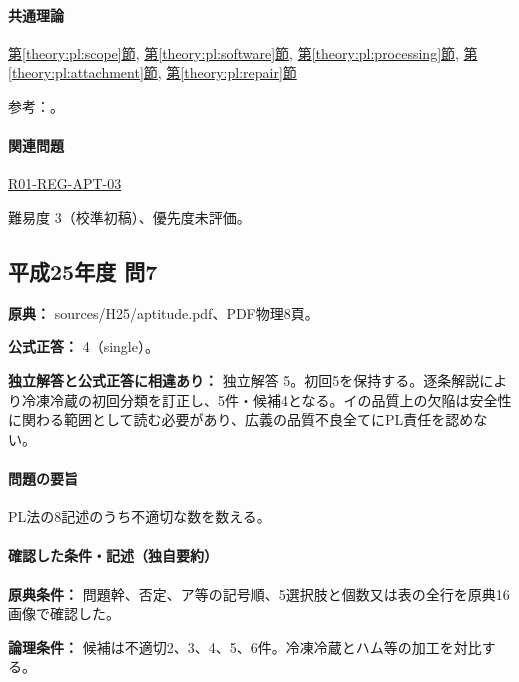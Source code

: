 \paragraph{共通理論} \hyperref[theory:pl:scope]{第\ref*{theory:pl:scope}節}, \hyperref[theory:pl:software]{第\ref*{theory:pl:software}節}, \hyperref[theory:pl:processing]{第\ref*{theory:pl:processing}節}, \hyperref[theory:pl:attachment]{第\ref*{theory:pl:attachment}節}, \hyperref[theory:pl:repair]{第\ref*{theory:pl:repair}節}

\par 参考：\cite{pl_statute,pl_qa,pl_definitions2018}。

\paragraph{関連問題} \hyperref[q:r01-reg-apt-03]{R01-REG-APT-03}

\par 難易度 3（校準初稿）、優先度未評価。

\subsection{平成25年度 問7}
\label{q:h25-reg-apt-07}

\noindent\textbf{原典：} sources/H25/aptitude.pdf、PDF物理8頁。

\textbf{公式正答：} 4（single）。

\par\textbf{独立解答と公式正答に相違あり：} 独立解答 5。初回5を保持する。逐条解説により冷凍冷蔵の初回分類を訂正し、5件・候補4となる。イの品質上の欠陥は安全性に関わる範囲として読む必要があり、広義の品質不良全てにPL責任を認めない。

\paragraph{問題の要旨} PL法の8記述のうち不適切な数を数える。

\paragraph{確認した条件・記述（独自要約）}\mbox{}\par

\noindent\textbf{原典条件：} 問題幹、否定、ア等の記号順、5選択肢と個数又は表の全行を原典16画像で確認した。\par

\noindent\textbf{論理条件：} 候補は不適切2、3、4、5、6件。冷凍冷蔵とハム等の加工を対比する。\par

